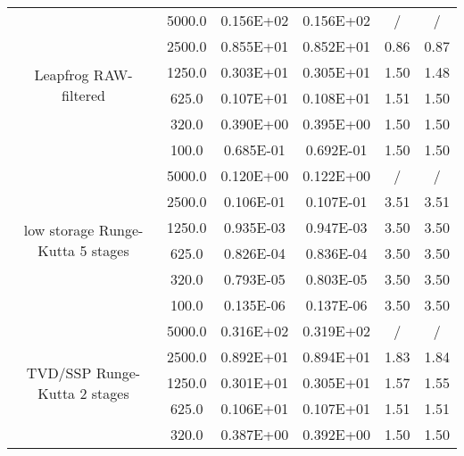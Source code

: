 \documentclass[pdftex,preprint,3p,times,numbers]{elsarticle}
\begin{document}
\begin{table}[!ht]
{\begin{tabular}{cccccc}
    \cmidrule{2-6}
    \multirow{6}{*}{Leapfrog RAW-filtered}
                 &   5000.0        &  0.156E+02    &  0.156E+02    & /             & /             \\
                 &   2500.0        &  0.855E+01    &  0.852E+01    & 0.86          & 0.87          \\
                 &   1250.0        &  0.303E+01    &  0.305E+01    & 1.50          & 1.48          \\
                 &    625.0        &  0.107E+01    &  0.108E+01    & 1.51          & 1.50          \\
                 &    320.0        &  0.390E+00    &  0.395E+00    & 1.50          & 1.50          \\
                 &    100.0        &  0.685E-01    &  0.692E-01    & 1.50          & 1.50          \\
    \cmidrule{2-6}
    \multirow{6}{*}{low storage Runge-Kutta 5 stages}
                 &   5000.0        &  0.120E+00    &  0.122E+00    & /             & /             \\
                 &   2500.0        &  0.106E-01    &  0.107E-01    & 3.51          & 3.51          \\
                 &   1250.0        &  0.935E-03    &  0.947E-03    & 3.50          & 3.50          \\
                 &    625.0        &  0.826E-04    &  0.836E-04    & 3.50          & 3.50          \\
                 &    320.0        &  0.793E-05    &  0.803E-05    & 3.50          & 3.50          \\
                 &    100.0        &  0.135E-06    &  0.137E-06    & 3.50          & 3.50          \\
    \cmidrule{2-6}
    \multirow{6}{*}{TVD/SSP Runge-Kutta 2 stages}
                 &   5000.0        &  0.316E+02    &  0.319E+02    & /             & /             \\
                 &   2500.0        &  0.892E+01    &  0.894E+01    & 1.83          & 1.84          \\
                 &   1250.0        &  0.301E+01    &  0.305E+01    & 1.57          & 1.55          \\
                 &    625.0        &  0.106E+01    &  0.107E+01    & 1.51          & 1.51          \\
                 &    320.0        &  0.387E+00    &  0.392E+00    & 1.50          & 1.50          \\

\end{tabular}}
\end{table}
\end{document}
